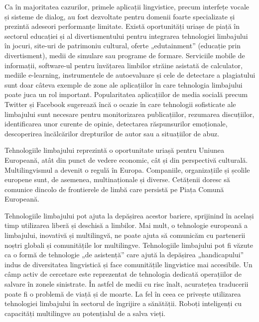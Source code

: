 \begin{multicols}{2}
Ca în majoritatea cazurilor, primele aplicații lingvistice, precum interfețe vocale și sisteme de dialog, au fost dezvoltate pentru domenii foarte specializate și prezintă adeseori performanțe limitate. Există oportunități uriașe de piață în sectorul educației și al divertismentului pentru integrarea tehnologiei limbajului în jocuri, site-uri de patrimoniu cultural, oferte „edutainment” (educație prin divertisment), medii de simulare sau programe de formare. Serviciile mobile de informații, software-ul pentru învățarea limbilor străine asistată de calculator, mediile e-learning, instrumentele de autoevaluare și cele de detectare a plagiatului sunt doar câteva exemple de zone ale aplicațiilor în care tehnologia limbajului poate juca un rol important. Popularitatea aplicațiilor de media socială precum Twitter și Facebook sugerează încă o ocazie în care tehnologii sofisticate ale limbajului sunt necesare pentru monitorizarea publicațiilor, rezumarea discuțiilor, identificarea unor curente de opinie, detectarea răspunsurilor emoționale, descoperirea încălcărilor drepturilor de autor sau a situațiilor de abuz.

Tehnologiile limbajului reprezintă o oportunitate uriașă pentru Uniunea Europeană, atât din punct de vedere economic, cât și din perspectivă culturală. Multilingvismul a devenit o regulă în Europa. Companiile, organizațiile și școlile europene sunt, de asemenea, multinaționale și diverse. Cetățenii doresc să comunice dincolo de frontierele de limbă care persistă pe Piața Comună Europeană. 


Tehnologiile limbajului pot ajuta la depășirea acestor bariere, sprijinind în același timp utilizarea liberă și deschisă a limbilor. Mai mult, o tehnologie europeană a limbajului, inovativă și multilingvă, ne poate ajuta să comunicăm cu partenerii noștri globali și comunitățile lor multilingve. Tehnologiile limbajului pot fi văzute ca o formă de tehnologie „de asistență” care ajută la depășirea „handicapului” indus de diversitatea lingvistică și face comunitățile lingvistice mai accesibile.
Un câmp activ de cercetare este reprezentat de tehnologia dedicată operațiilor de salvare în zonele sinistrate. În astfel de medii cu risc înalt, acuratețea traducerii poate fi o problemă de viață și de moarte. La fel în ceea ce privește utilizarea tehnologiei limbajului în sectorul de îngrijire a sănătății. Roboți inteligenți cu capacități multilingve au potențialul de a salva vieți.


\end{multicols}
